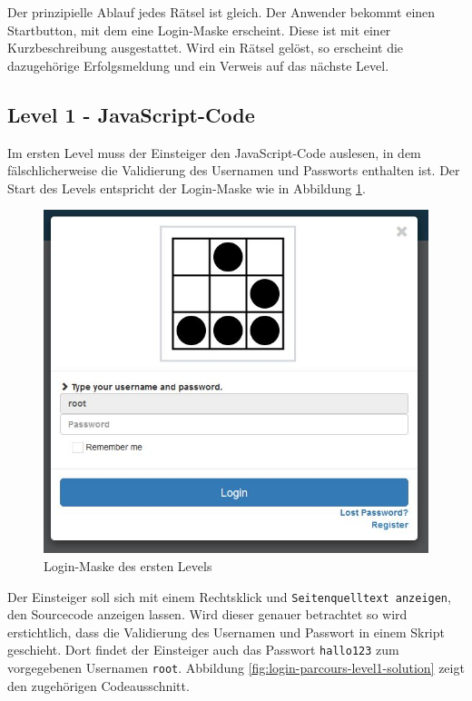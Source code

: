 Der prinzipielle Ablauf jedes Rätsel ist gleich. Der Anwender bekommt einen Startbutton, mit dem eine Login-Maske erscheint. Diese ist mit einer Kurzbeschreibung ausgestattet. Wird ein Rätsel gelöst, so erscheint die dazugehörige Erfolgsmeldung und ein Verweis auf das nächste Level. 

\subsection{Level 1 - JavaScript-Code}
Im ersten Level muss der Einsteiger den JavaScript-Code auslesen, in dem fälschlicherweise die Validierung des Usernamen und Passworts enthalten ist. Der Start des Levels entspricht der Login-Maske wie in Abbildung \ref{fig:login-parcours-level1}.

\begin{figure}[H]
	\centering
	\includegraphics[width=\textwidth]{images/LoginParcours/login_level1.jpg}
	\caption{Login-Maske des ersten Levels}
	\label{fig:login-parcours-level1}
\end{figure}

Der Einsteiger soll sich mit einem Rechtsklick und \colorbox{altgray}{\lstinline|Seitenquelltext anzeigen|}, den Sourcecode anzeigen lassen. Wird dieser genauer betrachtet so wird erstichtlich, dass die Validierung des Usernamen und Passwort in einem Skript geschieht. Dort findet der Einsteiger auch das Passwort \colorbox{altgray}{\lstinline|hallo123|} zum vorgegebenen Usernamen \colorbox{altgray}{\lstinline|root|}. Abbildung \ref{fig:login-parcours-level1-solution} zeigt den zugehörigen Codeausschnitt. 

